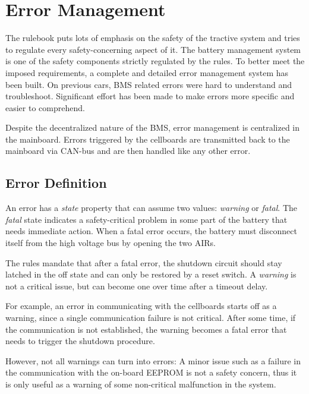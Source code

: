 \chapter{Error Management}
The rulebook puts lots of emphasis on the safety of the tractive system and tries to regulate every safety-concerning aspect of it. The battery management system is one of the safety components strictly regulated by the rules. To better meet the imposed requirements, a complete and detailed error management system has been built. On previous cars, BMS related errors were hard to understand and troubleshoot. Significant effort has been made to make errors more specific and easier to comprehend.

Despite the decentralized nature of the BMS, error management is centralized in the mainboard. Errors triggered by the cellboards are transmitted back to the mainboard via CAN-bus and are then handled like any other error.

\section{Error Definition}
An error has a \textit{state} property that can assume two values: \textit{warning} or \textit{fatal}. The \textit{fatal} state indicates a safety-critical problem in some part of the battery that needs immediate action. When a fatal error occurs, the battery must disconnect itself from the high voltage bus by opening the two AIRs.

The rules mandate that after a fatal error, the shutdown circuit should stay latched in the off state and can only be restored by a reset switch. A \textit{warning} is not a critical issue, but can become one over time after a timeout delay.

For example, an error in communicating with the cellboards starts off as a warning, since a single communication failure is not critical. After some time, if the communication is not established, the warning becomes a fatal error that needs to trigger the shutdown procedure.

However, not all warnings can turn into errors: A minor issue such as a failure in the communication with the on-board EEPROM is not a safety concern, thus it is only useful as a warning of some non-critical malfunction in the system.


